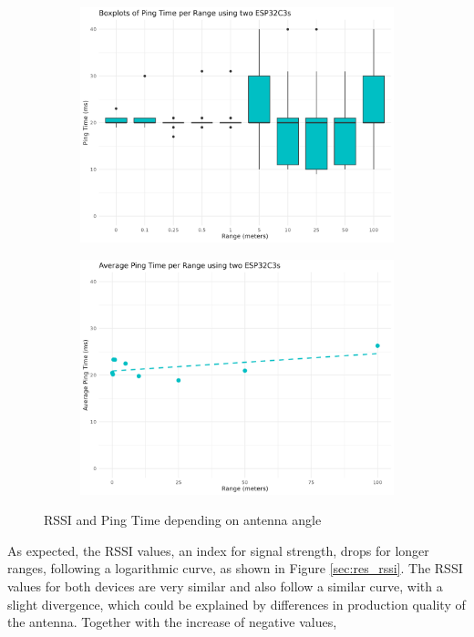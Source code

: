 \begin{figure}[H]
    \begin{subfigure}{0.45\textwidth}
        \includegraphics[width=\linewidth]{rstudio/analysis/plots/ESP32C3_ping_box.png}
    \end{subfigure}
    \begin{subfigure}{0.45\textwidth}
        \includegraphics[width=\linewidth]{rstudio/analysis/plots/ESP32C3_avg_ping.png}
    \end{subfigure}
    \vspace{\ftspace}
    \caption{RSSI and Ping Time depending on antenna angle}
    \label{fig:rssipingrange_esp32c3}
\end{figure}

As expected, the RSSI values, an index for signal strength, drops for longer ranges, following a logarithmic curve, as shown in Figure \ref{sec:res_rssi}. The RSSI values for both devices are very similar and also follow a similar curve, with a slight divergence, which could be explained by differences in production quality of the antenna. Together with the increase of negative values, 

